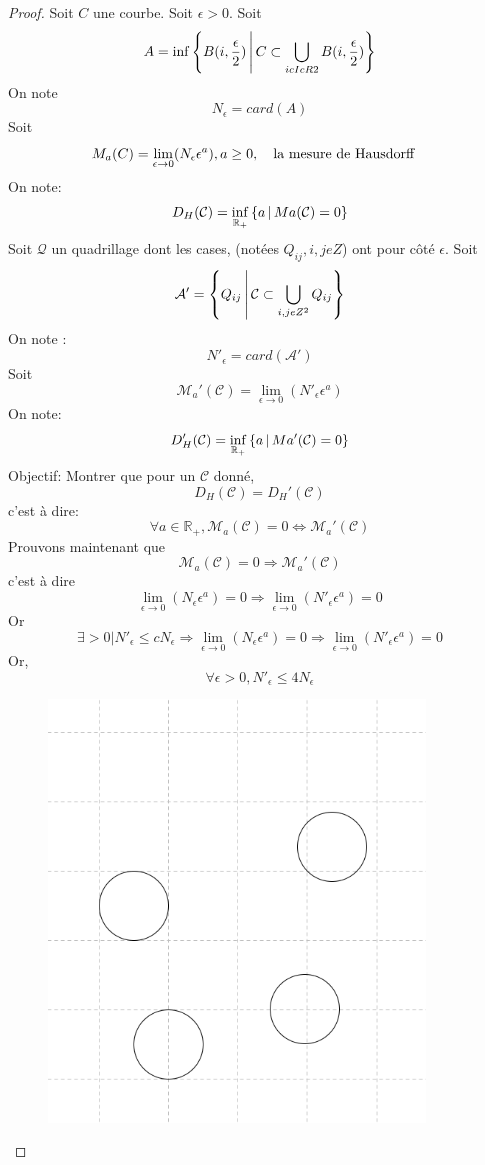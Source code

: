 \begin{proof}
Soit $C$ une courbe. 
Soit $\epsilon>0$.
Soit \[A=\inf \left\{B(i, \frac{\epsilon}{2})\,\middle|\,C\subset \bigcup_{icIcR2} B(i, \frac{\epsilon}{2})\right\}\]
On note \[N_\epsilon =card(A)\]
Soit \[M_a (C)=\lim\limits_{\epsilon\rightarrow0}(N_\epsilon\epsilon^{a}), a\geq0, \quad \text{la mesure de Hausdorff} \quad\]
On note: \[D_{H}(\mathcal{C})=\inf_{\mathbb{R}_{+}} \left\{a\,\middle|\,Ma(\mathcal{C})=0\right\}\]
Soit $\mathcal{Q}$ un quadrillage dont les cases, (notées $Q_{ij}, i,j e Z$) ont pour côté $\epsilon$.
Soit \[\mathcal{A'}= \left\{Q_{ij}\,\middle|\,\mathcal{C}\subset \bigcup_{i,j e Z^{2}}Q_{ij}\right\}\]
On note : \[N'_{\epsilon}=card(\mathcal{A'})\]
Soit \[\mathcal{M}_{a}'(\mathcal{C})=\lim\limits_{\epsilon\rightarrow0}(N'_\epsilon\epsilon^{a})\]
On note: \[D_{H}'(\mathcal{C})=\inf_{\mathbb{R}_{+}} \left\{a\,\middle|\,Ma'(\mathcal{C})=0\right\}\]
Objectif: Montrer que pour un $\mathcal{C}$ donné, \[D_{H}(\mathcal{C})=D_{H}'(\mathcal{C})\]
c'est à dire:\[\forall a \in \mathbb{R}_{+}, \mathcal{M}_{a}(\mathcal{C})=0\Leftrightarrow \mathcal{M}_{a}'(\mathcal{C})\]
Prouvons maintenant que \[\mathcal{M}_{a}(\mathcal{C})=0 \Rightarrow \mathcal{M}_{a}'(\mathcal{C}) \]
c'est à dire \[\lim\limits_{\epsilon\rightarrow0}(N_\epsilon\epsilon^{a})=0 \Rightarrow \lim\limits_{\epsilon\rightarrow0}(N'_\epsilon\epsilon^{a})=0\]
Or \[\exists>0 | N'_{\epsilon} \leq cN_{\epsilon} \Rightarrow \lim\limits_{\epsilon\rightarrow0}(N_\epsilon\epsilon^{a})=0 \Rightarrow \lim\limits_{\epsilon\rightarrow0}(N'_\epsilon\epsilon^{a})=0\]
Or, \[\forall\epsilon > 0, N'_{\epsilon} \leq 4N_{\epsilon}\]
\begin{figure}[h]
\centering
\includegraphics[width=10cm]{cases.png}

\end{figure}
\end{proof}
